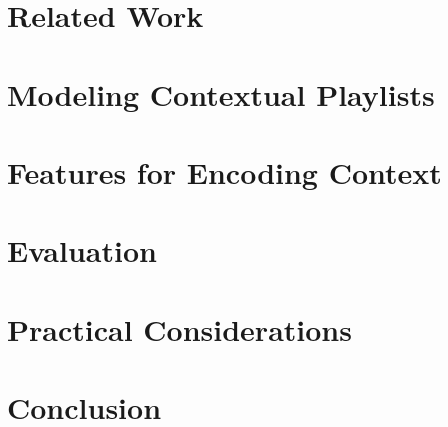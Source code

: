 \documentclass{sig-alternate}
\begin{document}
\section{Related Work}
\label{sec:Related}
    
\section{Modeling Contextual Playlists}
\label{sec:ourapproach}
    
\section{Features for Encoding Context}
\label{sec:Features}
	
\section{Evaluation}
\label{sec:experiments}
    
 \section{Practical Considerations}
 \label{sec:practicalConsiderations}
 
%    
\section{Conclusion}
    
\label{sec:conclusion}



\end{document}
